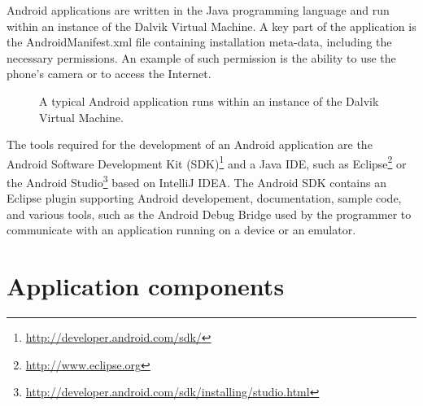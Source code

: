 Android applications are written in the Java programming language and run within an instance of the Dalvik Virtual Machine.
A key part of the application is the AndroidManifest\@.xml file containing installation meta-data, including the necessary permissions.
An example of such permission is the ability to use the phone's camera or to access the Internet.
\begin{figure}[h!]
    \caption{A typical Android application runs within an instance of the Dalvik Virtual Machine.}
\end{figure}

The tools required for the development of an Android application are the Android Software Development Kit (SDK)\footnote{\url{http://developer.android.com/sdk/}} and a Java IDE, such as Eclipse\footnote{\url{http://www.eclipse.org}} or the Android Studio\footnote{\url{http://developer.android.com/sdk/installing/studio.html}} based on IntelliJ IDEA. 
The Android SDK contains an Eclipse plugin supporting Android developement, documentation, sample code, and various tools, such as the Android Debug Bridge used by the programmer to communicate with an application running on a device or an emulator. 


\section{Application components}

